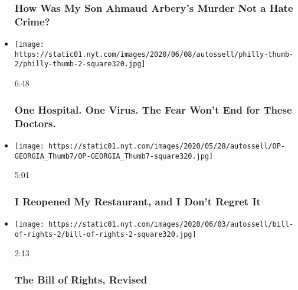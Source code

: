 \begin{itemize}
{  \subsubsection{How Was My Son Ahmaud Arbery's Murder Not a Hate
  Crime?}\label{how-was-my-son-ahmaud-arberys-murder-not-a-hate-crime}}
\item
  \href{https://www.nytimes.com/video/opinion/100000007179767/coronavirus-hospital-philadelphia.html?action=click\&module=video-series-bar\&region=header\&pgtype=Article\&playlistId=video/opinion}{}

  \texttt{[image: https://static01.nyt.com/images/2020/06/08/autossell/philly-thumb-2/philly-thumb-2-square320.jpg]}

  6:48

  \hypertarget{one-hospital-one-virus-the-fear-wont-end-for-these-doctors}{%
  \subsubsection{One Hospital. One Virus. The Fear Won't End for These
  Doctors.}\label{one-hospital-one-virus-the-fear-wont-end-for-these-doctors}}
\item
  \href{https://www.nytimes.com/video/opinion/100000007161418/coronavirus-georgia-restaurant-reopening.html?action=click\&module=video-series-bar\&region=header\&pgtype=Article\&playlistId=video/opinion}{}

  \texttt{[image: https://static01.nyt.com/images/2020/05/28/autossell/OP-GEORGIA\_Thumb7/OP-GEORGIA\_Thumb7-square320.jpg]}

  5:01

  \hypertarget{i-reopened-my-restaurant-and-i-dont-regret-it}{%
  \subsubsection{I Reopened My Restaurant, and I Don't Regret
  It}\label{i-reopened-my-restaurant-and-i-dont-regret-it}}
\item
  \href{https://www.nytimes.com/video/opinion/100000007171122/protests-constitutional-rights.html?action=click\&module=video-series-bar\&region=header\&pgtype=Article\&playlistId=video/opinion}{}

  \texttt{[image: https://static01.nyt.com/images/2020/06/03/autossell/bill-of-rights-2/bill-of-rights-2-square320.jpg]}

  2:13

  \hypertarget{the-bill-of-rights-revised}{%
  \subsubsection{The Bill of Rights,
  Revised}\label{the-bill-of-rights-revised}}
\end{itemize}


